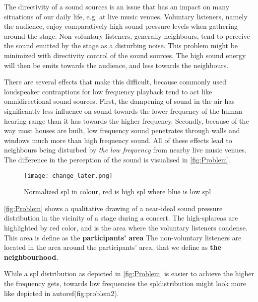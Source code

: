 
The directivity of a sound sources is an issue that has an impact on many situations of our daily life, e.g. at live music venues. Voluntary listeners, namely the audience, enjoy comparatively high sound pressure levels when gathering around the stage. Non-voluntary listeners, generally neighbours, tend to perceive the sound emitted by the stage as a disturbing noise. This problem might be minimized with directivity control of the sound sources. The high sound energy will then be emits towards the audience, and less towards the neighbours. 


There are several effects that make this difficult, because commonly used loudspeaker contraptions for low frequency playback tend to act like omnidirectional sound sources. First, the dampening of sound in the air has significantly less influence on sound towards the lower frequency of the human hearing range than it has towards the higher frequency. Secondly, because of the way most houses are built, low frequency sound penetrates through walls and windows much more than high frequency sound. All of these effects lead to neighbours being disturbed by \textit{the low frequency} from nearby live music venues.\\
The difference in the perception of the sound is visualised in \autoref{fig:Problem}.


\begin{figure}[htbp]
	\centering
	\texttt{[image: change\_later.png]}
	\caption{Normalized \gls{spl} in colour, red is high \gls{spl} where blue is low \gls{spl}}
		\label{fig:Problem}
\end{figure}

\autoref{fig:Problem} shows a qualitative drawing of a near-ideal sound pressure distribution in the vicinity of a stage during a concert. The high-\gls{spl}areas are highlighted by red color, and is the area where the voluntary listeners condense. This area is define as the \textbf{participants' area} The non-voluntary listeners are located in the area around the participants' area, that we define as \textbf{the neighbourhood}. 

While a \gls{spl} distribution as depicted in \autoref{fig:Problem} is easier to achieve the higher the frequency gets, towards low frequencies the \gls{spl}distribution might look more like depicted in autoref(fig:problem2).



